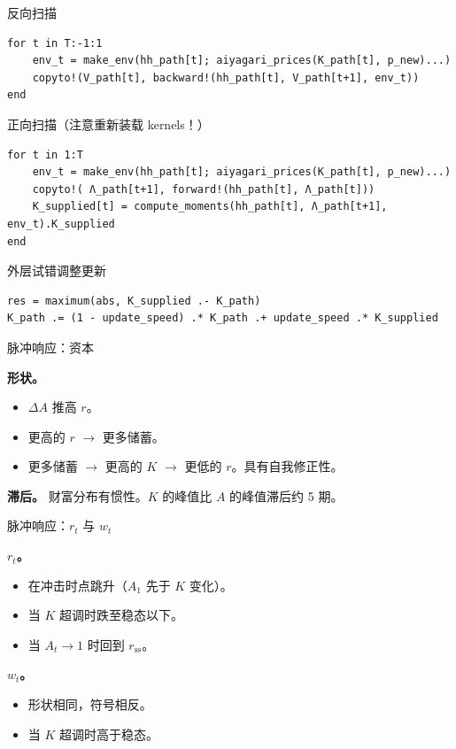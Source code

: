 \documentclass[10pt,aspectratio=169]{beamer}
\begin{document}
\begin{frame}[fragile]{反向扫描}
\begin{lstlisting}
for t in T:-1:1
    env_t = make_env(hh_path[t]; aiyagari_prices(K_path[t], p_new)...)
    copyto!(V_path[t], backward!(hh_path[t], V_path[t+1], env_t))
end
\end{lstlisting}

\end{frame}

\begin{frame}[fragile]{正向扫描（注意重新装载 kernels！）}
\begin{lstlisting}
for t in 1:T
    env_t = make_env(hh_path[t]; aiyagari_prices(K_path[t], p_new)...)
    copyto!( Λ_path[t+1], forward!(hh_path[t], Λ_path[t]))
    K_supplied[t] = compute_moments(hh_path[t], Λ_path[t+1], env_t).K_supplied
end
\end{lstlisting}

\end{frame}

\begin{frame}[fragile]{外层试错调整更新}
\begin{lstlisting}
res = maximum(abs, K_supplied .- K_path)
K_path .= (1 - update_speed) .* K_path .+ update_speed .* K_supplied
\end{lstlisting}

\end{frame}


\begin{frame}{脉冲响应：资本}

\textbf{形状。}

\begin{itemize}
  \item $\Delta A$ 推高 $r$。
  \item 更高的 $r$ $\to$ 更多储蓄。
  \item 更多储蓄 $\to$ 更高的 $K$ $\to$ 更低的 $r$。具有自我修正性。
\end{itemize}

\vspace{0.4em}

\textbf{滞后。} 财富分布有惯性。$K$ 的峰值比 $A$ 的峰值滞后约 5 期。

\end{frame}

\begin{frame}{脉冲响应：$r_t$ 与 $w_t$}

\textbf{$r_t$。}

\begin{itemize}
  \item 在冲击时点跳升（$A_1$ 先于 $K$ 变化）。
  \item 当 $K$ 超调时跌至稳态以下。
  \item 当 $A_t \to 1$ 时回到 $r_{\mathrm{ss}}$。
\end{itemize}

\textbf{$w_t$。}

\begin{itemize}
  \item 形状相同，符号相反。
  \item 当 $K$ 超调时高于稳态。
\end{itemize}

\end{frame}
\end{document}
